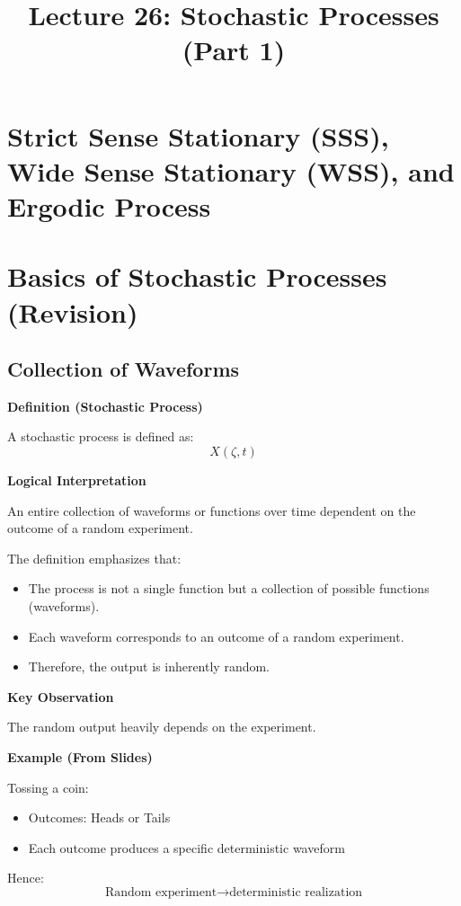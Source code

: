 \documentclass[12pt]{article}
\title{Lecture 26: Stochastic Processes (Part 1)}
\author{}
\date{}
\begin{document}
\maketitle

\section*{Strict Sense Stationary (SSS), Wide Sense Stationary (WSS), and Ergodic Process}

\section{Basics of Stochastic Processes (Revision)}

\subsection{Collection of Waveforms}

\textbf{Definition (Stochastic Process)}  

A stochastic process is defined as:
\[
X(\zeta, t)
\]

\textbf{Logical Interpretation}  

An entire collection of waveforms or functions over time dependent on the outcome of a random experiment.

The definition emphasizes that:
\begin{itemize}
    \item The process is not a single function but a collection of possible functions (waveforms).
    \item Each waveform corresponds to an outcome of a random experiment.
    \item Therefore, the output is inherently random.
\end{itemize}

\textbf{Key Observation}  

The random output heavily depends on the experiment.

\textbf{Example (From Slides)}  

Tossing a coin:
\begin{itemize}
    \item Outcomes: Heads or Tails
    \item Each outcome produces a specific deterministic waveform
\end{itemize}

Hence:
\[
\text{Random experiment} \rightarrow \text{deterministic realization}
\]
\end{document}
